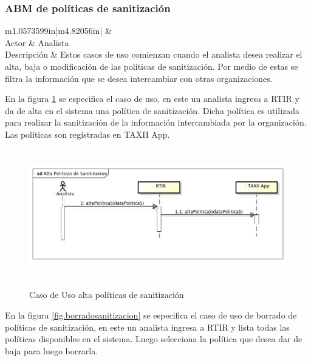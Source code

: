 \subsubsection{ABM de políticas de sanitización}
\begin{flushleft}
	\tablefirsthead{}
	\tablehead{}
	\tabletail{}
	\tablelasttail{}
	\begin{supertabular}{m{1.0573599in}|m{4.82056in}|}
		 &
		\\\hline
		{Actor} &
		{Analista}\\
		{Descripción} &
		{Estos casos de uso comienzan cuando el analista desea realizar el alta, baja o
			modificación de las políticas de sanitización. Por medio de estas se filtra la información que se desea intercambiar
			con otras organizaciones.}\\\hhline{~-}
	\end{supertabular}
\end{flushleft}

\bigskip

{
	\bigskip
	En la figura \ref{fig.altasanitizacion} se especifica el caso de uso, en este un analista ingresa a RTIR y da de alta en el sistema una política
	de sanitización. Dicha política es utilizada para realizar la sanitización de la información intercambiada por la
	organización. Las políticas son registradas en TAXII App.}
\bigskip
\begin{figure}[H]
	\centering
	\includegraphics[width=5.7638in,height=2.3575in]{Analisis22-img/Analisis22-img017.png} 
	\caption{Caso de Uso alta políticas de sanitización}
	\label{fig.altasanitizacion}
\end{figure}

\bigskip

En la figura \ref{fig.borradosanitizacion} se especifica el caso de uso de borrado de políticas de sanitización, en este un analista ingresa a RTIR
y lista todas las políticas disponibles en el sistema. Luego selecciona la política que desea dar de baja para luego
borrarla.

